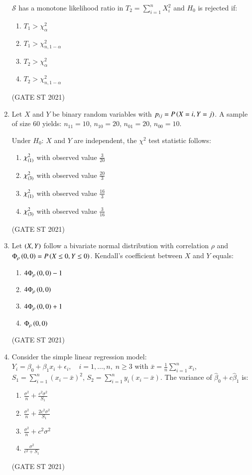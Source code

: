 \documentclass[journal,12pt,onecolumn]{IEEEtran}
\theoremstyle{remark}
\begin{document}
\begin{enumerate}
$\mathcal{S}$ has a monotone likelihood ratio in $T_2 = \sum_{i=1}^n X_i^2$ and $H_0$ is rejected if:
\begin{enumerate}
\item $T_1 > \chi_\alpha^2$
\item $T_1 > \chi_{n,1-\alpha}^2$
\item $T_2 > \chi_\alpha^2$
\item $T_2 > \chi_{n,1-\alpha}^2$
\end{enumerate}
\hfill (GATE ST 2021) \\


\item
Let $X$ and $Y$ be binary random variables with $p_{ij} = P\left(X = i, Y = j\right)$.  
A sample of size $60$ yields: $n_{11} = 10$, $n_{10} = 20$, $n_{01} = 20$, $n_{00} = 10$.

Under $H_0$: $X$ and $Y$ are independent, the $\chi^2$ test statistic follows:

\begin{enumerate}
\item $\chi^2_{\left(1\right)}$ with observed value $\frac{3}{20}$
\item $\chi^2_{\left(3\right)}$ with observed value $\frac{20}{3}$
\item $\chi^2_{\left(1\right)}$ with observed value $\frac{16}{3}$
\item $\chi^2_{\left(3\right)}$ with observed value $\frac{3}{16}$
\end{enumerate}
\hfill (GATE ST 2021) \\


\item
Let $\left(X,Y\right)$ follow a bivariate normal distribution with correlation $\rho$ and $\Phi_\rho\left(0,0\right)= P\left(X \leq 0, Y \leq 0\right)$.  
Kendall's coefficient between $X$ and $Y$ equals:
\begin{enumerate}
\item $4\Phi_\rho\left(0,0\right) - 1$
\item $4\Phi_\rho\left(0,0\right)$
\item $4\Phi_\rho\left(0,0\right) + 1$
\item $\Phi_\rho\left(0,0\right)$
\end{enumerate}
\hfill (GATE ST 2021) \\

\item
Consider the simple linear regression model:
$
Y_i = \beta_0 + \beta_1 x_i + \epsilon_i, \quad i = 1, \dots, n, \; n \geq 3
$
with $\bar{x} = \frac{1}{n} \sum_{i=1}^n x_i$, $S_1 = \sum_{i=1}^n (x_i - \bar{x})^2$, $S_2 = \sum_{i=1}^n y_i(x_i - \bar{x})$.  
The variance of $\hat{\beta}_0 + c \hat{\beta}_1$ is:
\begin{enumerate}
\item $\frac{\sigma^2}{n} + \frac{c^2\sigma^2}{S_1}$
\item $\frac{\sigma^2}{n} + \frac{2c^2\sigma^2}{S_1}$
\item $\frac{\sigma^2}{n} + c^2\sigma^2$
\item $\frac{\sigma^2}{c^2 + S_1}$
\end{enumerate}
\hfill (GATE ST 2021) \\


\end{enumerate}
\end{document}
